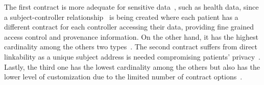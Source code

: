 The first contract is more adequate for sensitive data~\cite{DBLP:journals/corr/NeisseSF17}, such as health data, since a subject-controller relationship~\cite{Azaria2016} is being created where each patient has a different contract for each controller accessing their data, providing fine grained access control and provenance information. On the other hand, it has the highest cardinality among the others two types~\cite{DBLP:journals/corr/NeisseSF17}. The second contract suffers from direct linkability as a unique subject address is needed compromising patients’ privacy~\cite{DBLP:journals/corr/NeisseSF17}. Lastly, the third one has the lowest cardinality among the others but also has the lower level of customization due to the limited number of contract options~\cite{DBLP:journals/corr/NeisseSF17}.
